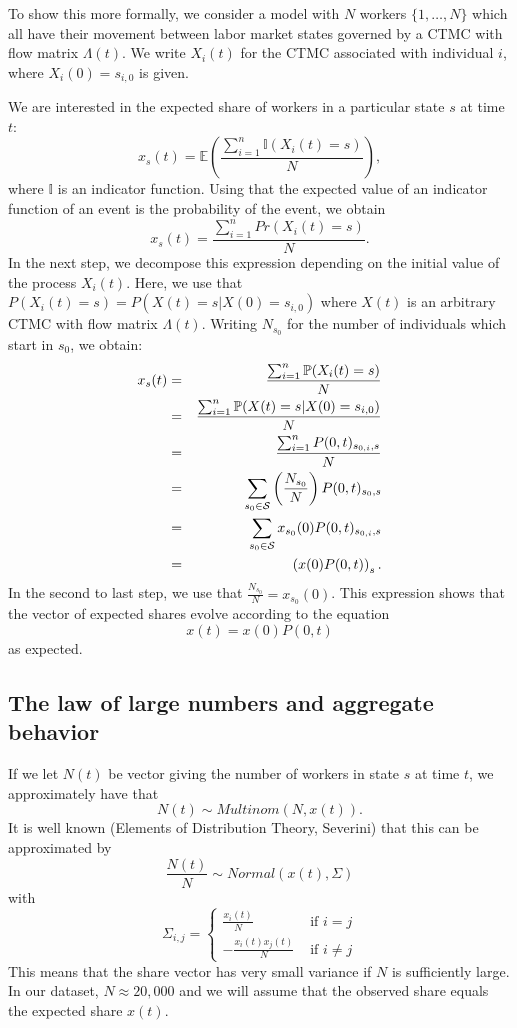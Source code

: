 \documentclass[11pt]{article}
\begin{document}
To show this more formally, we consider a model with $N$ workers $\{1,\dots,N\}$ which all have their movement between labor market states governed by a CTMC with flow matrix $\Lambda(t)$. We write $X_i(t)$ for the CTMC associated with individual $i$, where $X_i(0)=s_{i,0}$ is given.

We are interested in the expected share of workers in a particular state $s$ at time $t$:
\[
x_s(t)=\mathbb{E}\left(\frac{\sum_{i=1}^n \mathbb{I}(X_i(t)=s)}{N}\right),
\]
where $\mathbb{I}$ is an indicator function. Using that the expected value of an indicator function of an event is the probability of the event, we obtain
\[
x_s(t)=\frac{\sum_{i=1}^n Pr(X_i(t)=s)}{N}.
\]
In the next step, we decompose this expression depending on the initial value of the process $X_i(t)$. Here, we use that $P(X_i(t)=s)=P(X(t)=s|X(0)=s_{i,0})$ where $X(t)$ is an arbitrary CTMC with flow matrix $\Lambda(t)$. Writing $N_{s_{0}}$ for the number of individuals which start in $s_0$, we obtain:
\begin{eqnarray*}
	x_s(t) &=& \frac{\sum_{i=1}^n \mathbb{P}(X_{i}(t) = s)}{N}\\
	&=& \frac{\sum_{i=1}^n \mathbb{P}(X(t) = s | X(0)=s_{i,0})}{N}\\
	&=& \frac{\sum_{i=1}^n P(0,t)_{s_{0,i},s}}{N}\\
	&=& \sum_{s_0 \in \cal S}  \left(\frac{N_{s_0}}{N}\right)P(0,t)_{s_{0},s}\\
	&=& \sum_{s_0 \in \cal S} x_{s_0}(0) P(0,t)_{s_{0,i},s}\\
	&=& \left(x(0)P(0,t)\right)_s.
\end{eqnarray*}
In the second to last step, we use that $\frac{N_{s_0}}{N}=x_{s_0}(0)$. This expression shows that the vector of expected shares evolve according to the equation
\[
x(t)=x(0)P(0,t)
\]
as expected.

\subsection{The law of large numbers and aggregate behavior}
If we let $N(t)$ be vector giving the number of workers in state $s$ at time $t$, we approximately have that
\[
N(t) \sim Multinom(N, x(t)).
\]
It is well known (Elements of Distribution Theory, Severini) that this can be approximated by 
\[
\frac{N(t)}{N} \sim Normal(x(t), \Sigma)
\]
with
\[
\Sigma_{i,j} = \left\{\begin{array}{cc}
	\frac{x_i(t)}{N} & \mbox{ if $i=j$}\\
	-\frac{x_i(t)x_j(t)}{N} & \mbox{ if $i\neq j$} 
\end{array}\right.
\]
This means that the share vector has very small variance if $N$ is sufficiently large. In our dataset, $N\approx 20,000$ and we will assume that the observed share equals the expected share $x(t)$.
\end{document}
